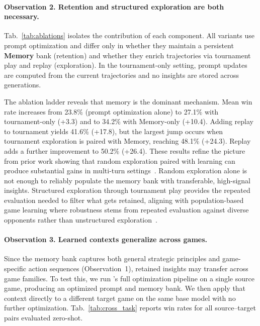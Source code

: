 \paragraph{Observation 2. Retention and structured exploration are both necessary.}
Tab.~\ref{tab:ablations} isolates the contribution of each component. All variants use prompt optimization and differ only in whether they maintain a persistent \textbf{Memory} bank (retention) and whether they enrich trajectories via tournament play and replay (exploration). In the tournament-only setting, prompt updates are computed from the current trajectories and no insights are stored across generations.

The ablation ladder reveals that memory is the dominant mechanism. Mean win rate increases from 23.8\% (prompt optimization alone) to 27.1\% with tournament-only (+3.3) and to 34.2\% with Memory-only (+10.4). Adding replay to tournament yields 41.6\% (+17.8), but the largest jump occurs when tournament exploration is paired with Memory, reaching 48.1\% (+24.3). Replay adds a further improvement to 50.2\% (+26.4). These results refine the picture from prior work showing that random exploration paired with learning can produce substantial gains in multi-turn settings~\citep{chen2025internalizing}. Random exploration alone is not enough to reliably populate the memory bank with transferable, high-signal insights. Structured exploration through tournament play provides the repeated evaluation needed to filter what gets retained, aligning with population-based game learning where robustness stems from repeated evaluation against diverse opponents rather than unstructured exploration~\citep{lanctot2017unified}.


 

\paragraph{Observation 3. Learned contexts generalize across games.}
Since the memory bank captures both general strategic principles and game-specific action sequences (Observation~1), retained insights may transfer across game families. To test this, we run \NAME{}'s full optimization pipeline on a single source game, producing an optimized prompt and memory bank. We then apply that context directly to a different target game on the same base model with no further optimization. Tab.~\ref{tab:cross_task} reports win rates for all source--target pairs evaluated zero-shot.

